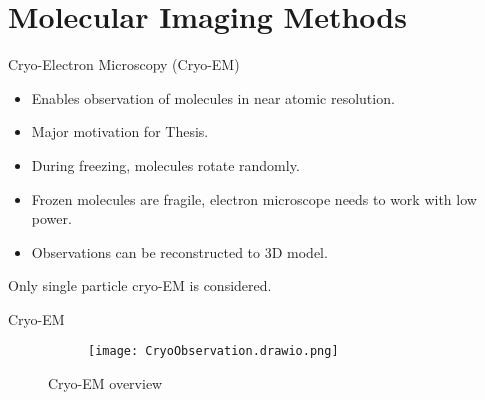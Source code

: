 
\section{Molecular Imaging Methods}	%

\begin{frame}[c]{Cryo-Electron Microscopy (Cryo-EM)}
    \begin{itemize}
        \item Enables observation of molecules in near atomic resolution.
        \item Major motivation for Thesis.
        \item During freezing, molecules rotate randomly.
        \item Frozen molecules are fragile, electron microscope needs to work with low power.
        \item Observations can be reconstructed to 3D model.
    \end{itemize}

    \begin{tcolorbox}[colback=red!5!white,hide=<-1>, alert=<2>, colframe=red!75!black]
        Only single particle cryo-EM is considered.
    \end{tcolorbox}

\end{frame}

\begin{frame}[c]{Cryo-EM}
    \begin{figure}
        \captionsetup[subfigure]{justification=centering}
        \centering
        \hfill
        \begin{subfigure}[t]{0.35\textwidth}
            \vskip 0pt
            \texttt{[image: CryoObservation.drawio.png]}
        \end{subfigure}\hfill
        \caption{Cryo-EM overview}
    \end{figure}

\end{frame}

